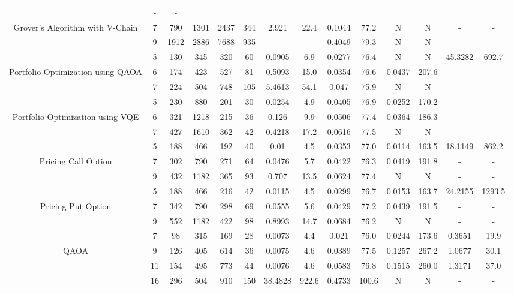 \begin{table}[htb]
{\begin{tabular}{|c|c|c|c|c|c|c|c|c|c|c|c|c|c|}
 & - & -
 \\
Grover's Algorithm with V-Chain & 
7 & 790 & 1301 & 2437 & 344
 & 2.921 & 22.4
 & 0.1044 & 77.2
 & N & N 
 & - & -
 \\
 & 
9 & 1912 & 2886 & 7688 & 935
 & - & -
 & 0.4049 & 79.3
 & N & N 
 & - & -
 \\
\hline
 & 
5 & 130 & 345 & 320 & 60
 & 0.0905 & 6.9
 & 0.0277 & 76.4
 & N & N 
 & 45.3282 & 692.7
 \\
Portfolio Optimization using QAOA & 
6 & 174 & 423 & 527 & 81
 & 0.5093 & 15.0
 & 0.0354 & 76.6
 & 0.0437 & 207.6
 & - & -
 \\
 & 
7 & 224 & 504 & 748 & 105
 & 5.4613 & 54.1
 & 0.047 & 75.9
 & N & N 
 & - & -
 \\
\hline
 & 
5 & 230 & 880 & 201 & 30
 & 0.0254 & 4.9
 & 0.0405 & 76.9
 & 0.0252 & 170.2
 & - & -
 \\
Portfolio Optimization using VQE & 
6 & 321 & 1218 & 215 & 36
 & 0.126 & 9.9
 & 0.0506 & 77.4
 & 0.0364 & 186.3
 & - & -
 \\
 & 
7 & 427 & 1610 & 362 & 42
 & 0.4218 & 17.2
 & 0.0616 & 77.5
 & N & N 
 & - & -
 \\
\hline
 & 
5 & 188 & 466 & 192 & 40
 & 0.01 & 4.5
 & 0.0353 & 77.0
 & 0.0114 & 163.5
 & 18.1149 & 862.2
 \\
Pricing Call Option & 
7 & 302 & 790 & 271 & 64
 & 0.0476 & 5.7
 & 0.0422 & 76.3
 & 0.0419 & 191.8
 & - & -
 \\
 & 
9 & 432 & 1182 & 365 & 93
 & 0.707 & 13.5
 & 0.0624 & 77.4
 & N & N 
 & - & -
 \\
\hline
 & 
5 & 188 & 466 & 216 & 42
 & 0.0115 & 4.5
 & 0.0299 & 76.7
 & 0.0153 & 163.7
 & 24.2155 & 1293.5
 \\
Pricing Put Option & 
7 & 342 & 790 & 298 & 69
 & 0.0555 & 5.6
 & 0.0429 & 77.2
 & 0.0439 & 191.5
 & - & -
 \\
 & 
9 & 552 & 1182 & 422 & 98
 & 0.8993 & 14.7
 & 0.0684 & 76.2
 & N & N 
 & - & -
 \\
\hline
 & 
7 & 98 & 315 & 169 & 28
 & 0.0073 & 4.4
 & 0.021 & 76.0
 & 0.0244 & 173.6
 & 0.3651 & 19.9
 \\
QAOA & 
9 & 126 & 405 & 614 & 36
 & 0.0075 & 4.6
 & 0.0389 & 77.5
 & 0.1257 & 267.2
 & 1.0677 & 30.1
 \\
 & 
11 & 154 & 495 & 773 & 44
 & 0.0076 & 4.6
 & 0.0583 & 76.8
 & 0.1515 & 260.0
 & 1.3171 & 37.0
 \\
\hline
 & 
16 & 296 & 504 & 910 & 150
 & 38.4828 & 922.6
 & 0.4733 & 100.6
 & N & N 
 & - & -
 \\

\end{tabular}}
\end{table}
